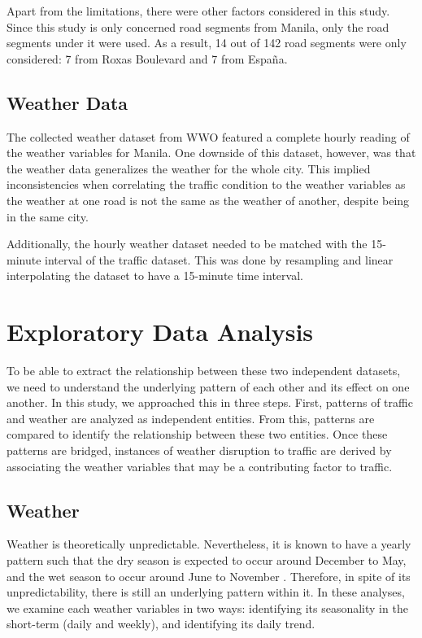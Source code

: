 Apart from the limitations, there were other factors considered in this study. Since this study is only concerned road segments from Manila, only the road segments under it were used. As a result, 14 out of 142 road segments were only considered: 7 from Roxas Boulevard and 7 from España.



\subsection{Weather Data}
The collected weather dataset from WWO featured a complete hourly reading of the weather variables for Manila. One downside of this dataset, however, was that the weather data generalizes the weather for the whole city. This implied inconsistencies when correlating the traffic condition to the weather variables as the weather at one road is not the same as the weather of another, despite being in the same city.

Additionally, the hourly weather dataset needed to be matched with the 15-minute interval of the traffic dataset. This was done by resampling and linear interpolating the dataset to have a 15-minute time interval.



















\section{Exploratory Data Analysis}
To be able to extract the relationship between these two independent datasets, we need to understand the underlying pattern of each other and its effect on one another. In this study, we approached this in three steps. First, patterns of traffic and weather are analyzed as independent entities. From this, patterns are compared to identify the relationship between these two entities. Once these patterns are bridged, instances of weather disruption to traffic are derived by associating the weather variables that may be a contributing factor to traffic.

\subsection{Weather}
Weather is theoretically unpredictable. Nevertheless, it is known to have a yearly pattern such that the dry season is expected to occur around December to May, and the wet season to occur around June to November . Therefore, in spite of its unpredictability, there is still an underlying pattern within it. In these analyses, we examine each weather variables in two ways: identifying its seasonality in the short-term (daily and weekly), and identifying its daily trend.

